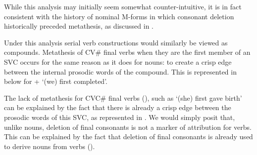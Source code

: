 While this analysis may initially seem somewhat counter-intuitive,
it is in fact consistent with the history
of nominal M-forms in which consonant deletion
historically preceded metathesis, as discussed in .

Under this analysis serial verb constructions would similarly be viewed as compounds.
Metathesis of CV{\#} final verbs when they are the first
member of an SVC occurs for the same reason as it does for nouns:
to create a crisp edge between the internal prosodic words of the compound.
This is represented in  below for
 +  {\ra}  `(we) first completed'.

The lack of metathesis for CVC{\#} final verbs (),
such as  `(she) first gave birth' can be explained
by the fact that there is already a crisp edge between the prosodic
words of this SVC, as represented in .
We would simply posit that, unlike nouns, deletion of final
consonants is not a marker of attribution for verbs.
This can be explained by the fact that deletion of final consonants
is already used to derive nouns from verbs ().

